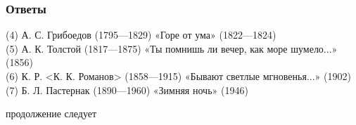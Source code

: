 \documentclass{beamer}
\begin{document}
%

\begin{frame}
\frametitle{Ответы}


(4) А. С. Грибоедов (1795—1829) «Горе от ума» (1822—1824)\\
(5) А. К. Толстой (1817—1875) «Ты помнишь ли вечер, как море шумело...» (1856)\\
(6) К. Р. <К. К. Романов> (1858—1915) «Бывают светлые мгновенья...» (1902)\\
(7)  Б. Л. Пастернак (1890—1960) «Зимняя ночь» (1946)

\end{frame}



\begin{frame}
\Huge{\centerline{продолжение следует}}
\end{frame}
\end{document}

